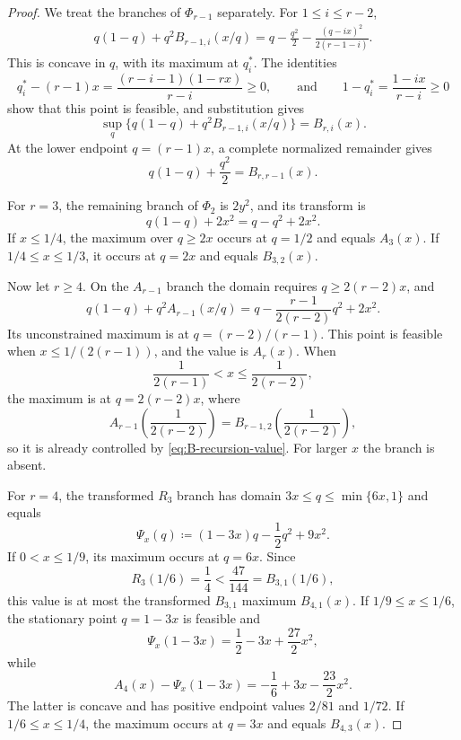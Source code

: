 \documentclass[10pt]{article}
\numberwithin{equation}{section}
\begin{document}
\begin{proof}
We treat the branches of $\Phi_{r-1}$ separately.  For $1\le i\le r-2$,
\begin{align}
 q(1-q)+q^2B_{r-1,i}(x/q)
=q-\frac{q^2}{2}
 -\frac{(q-ix)^2}{2(r-1-i)}.\label{eq:B-rec-expression}
\end{align}
This is concave in $q$, with its maximum at $q_i^*$.
The identities
\[
 q_i^*-(r-1)x
 =\frac{(r-i-1)(1-rx)}{r-i}\ge0,
 \qquad\text{and}\qquad
 1-q_i^*=\frac{1-ix}{r-i}\ge0
\]
show that this point is feasible, and substitution gives
\begin{equation}\label{eq:B-recursion-value}
 \sup_q\{q(1-q)+q^2B_{r-1,i}(x/q)\}=B_{r,i}(x).
\end{equation}
At the lower endpoint $q=(r-1)x$, a complete normalized remainder gives
\begin{equation}\label{eq:last-B-recursion-value}
 q(1-q)+\frac{q^2}{2}=B_{r,r-1}(x).
\end{equation}

For $r=3$, the remaining branch of $\Phi_2$ is $2y^2$, and its transform is
\[
 q(1-q)+2x^2=q-q^2+2x^2.
\]
If $x\le1/4$, the maximum over $q\ge2x$ occurs at $q=1/2$ and equals $A_3(x)$.  If $1/4\le x\le1/3$, it occurs at $q=2x$ and equals $B_{3,2}(x)$.

Now let $r\ge4$.  On the $A_{r-1}$ branch the domain requires $q\ge2(r-2)x$, and
\begin{equation}\label{eq:A-rec-expression}
 q(1-q)+q^2A_{r-1}(x/q)
 =q-\frac{r-1}{2(r-2)}q^2+2x^2.
\end{equation}
Its unconstrained maximum is at $q=(r-2)/(r-1)$.  This point is feasible when $x\le1/(2(r-1))$, and the value is $A_r(x)$.  When
\[
 \frac1{2(r-1)}<x\le\frac1{2(r-2)},
\]
the maximum is at $q=2(r-2)x$, where
\[
 A_{r-1}\!\left(\frac1{2(r-2)}\right)
 =B_{r-1,2}\!\left(\frac1{2(r-2)}\right),
\]
so it is already controlled by \cref{eq:B-recursion-value}.  For larger $x$ the branch is absent.

For $r=4$, the transformed $R_3$ branch has domain $3x\le q\le\min\{6x,1\}$ and equals
\[
 \Psi_x(q)\coloneqq(1-3x)q-\frac12q^2+9x^2.
\]
If $0<x\le1/9$, its maximum occurs at $q=6x$.  Since
\[
 R_3(1/6)=\frac14<\frac{47}{144}=B_{3,1}(1/6),
\]
this value is at most the transformed $B_{3,1}$ maximum $B_{4,1}(x)$.  If $1/9\le x\le1/6$, the stationary point $q=1-3x$ is feasible and
\[
 \Psi_x(1-3x)=\frac12-3x+\frac{27}{2}x^2,
\]
while
\[
 A_4(x)-\Psi_x(1-3x)=-\frac16+3x-\frac{23}{2}x^2.
\]
The latter is concave and has positive endpoint values $2/81$ and $1/72$.  If $1/6\le x\le1/4$, the maximum occurs at $q=3x$ and equals $B_{4,3}(x)$.


\end{proof}
\end{document}
